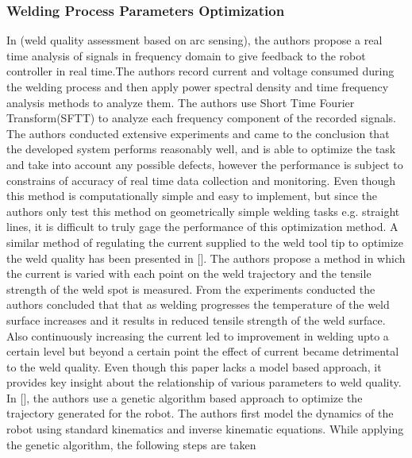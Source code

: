 \subsubsection{Welding Process Parameters Optimization}
In \citet{Lubecki2015}(weld quality assessment based on arc sensing), the authors propose a real time analysis of signals in frequency domain to give feedback to the robot controller in real time.The authors record current and voltage consumed during the welding process and then apply power spectral density and time frequency analysis methods to analyze them. The authors use Short Time Fourier Transform(SFTT) to analyze each frequency component of the recorded signals. The authors conducted extensive experiments and came to the conclusion that the developed system performs reasonably well, and is able to optimize the task and take into account any possible defects, however the performance is subject to constrains of accuracy of real time data collection and monitoring. Even though this method is computationally simple and easy to implement, but since the authors only test this method on geometrically simple welding tasks e.g. straight lines, it is difficult to truly gage the performance of this optimization method. A similar method of regulating the current supplied to the weld tool tip to optimize the weld quality has been presented in [\citet{Liang2011}]. The authors propose a method in which the current is varied with each point on the weld trajectory and the tensile strength of the weld spot is measured. From the experiments conducted the authors concluded that that as welding progresses the temperature of the weld surface increases and it results in reduced tensile strength of the weld surface. Also continuously increasing the current led to improvement in welding upto a certain level but beyond a certain point the effect of current became detrimental to the weld quality. Even though this paper lacks a model based approach, it provides key insight about the relationship of various parameters to weld quality.\\
In [\citet{XiaopingLiao2010}], the authors use a genetic algorithm based approach to optimize the trajectory generated for the robot. The authors first model the dynamics of the robot using standard kinematics and inverse kinematic equations. While applying the genetic algorithm, the following steps are taken
